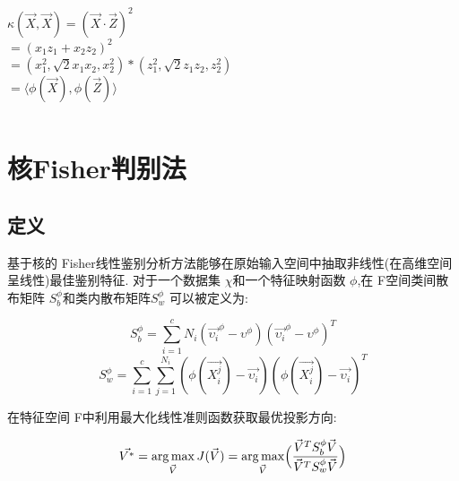 \documentclass[12pt,a4paper,CJK]{beamer}
\DeclareMathOperator*{\argmax}{arg\,max}
\begin{document}
\begin{CJK*}{UTF8}{gkai}
\begin{frame}{\subsecname}
\begin{columns}
\begin{column}{.50\textwidth}
\begin{definition}
  \end{definition}  
    \begin{displaybox}{64mm}
		$\kappa(\vec{X},\vec{X}) =(\vec{X}\cdot\vec{Z})^2$\\
		$=(x_1z_1+x_2z_2)^2$\\
		$=(x_1^2,\sqrt{2}x_1x_2,x_2^2)*(z_1^2,\sqrt{2}z_1z_2,z_2^2)$\\
		$=\langle \phi(\vec{X}),\phi(\vec{Z})\rangle	$
	\end{displaybox}
  
  \end{column}
\end{columns}
\end{frame}


\section{核Fisher判别法}
\subsection{定义}
\begin{frame}{\subsecname}
	基于核的 Fisher线性鉴别分析方法能够在原始输入空间中抽取非线性(在高维空间呈线性)最佳鉴别特征.
	对于一个数据集 $\chi$和一个特征映射函数 $\phi$,在 F空间类间散布矩阵 $S_b^\phi$和类内散布矩阵$S_w^\phi$ 可以被定义为:
	\begin{displaybox}{90mm}
 		\[
 		S_b^\phi=\sum_{i=1}^{c}N_i(\vec{\upsilon_i}^\phi-\upsilon^\phi)(\vec{\upsilon_i}^\phi-\upsilon^\phi)^T 		
 		\]\[
 			S_w^\phi = \sum_{i=1}^{c} \sum_{j=1}^{N_i}(\phi(\vec{X_i^j})-\vec{\upsilon_i})(\phi(\vec{X_i^j})-\vec{\upsilon_i})^T 		\]
	\end{displaybox}
	在特征空间 F中利用最大化线性准则函数获取最优投影方向:
	\begin{displaybox}{90mm}
 		\[ 			
 			\vec{V^*} = 
 			\argmax_{\vec{V}} J(\vec{V})=
 			\argmax_{\vec{V}} \Bigl(
 			\frac{\vec{V}^T S_b^\phi \vec{V}}{\vec{V}^T S_w^\phi \vec{V}}
 			\Bigr)
 		\]
	\end{displaybox}
\end{frame}


\end{CJK*}
\end{document}
